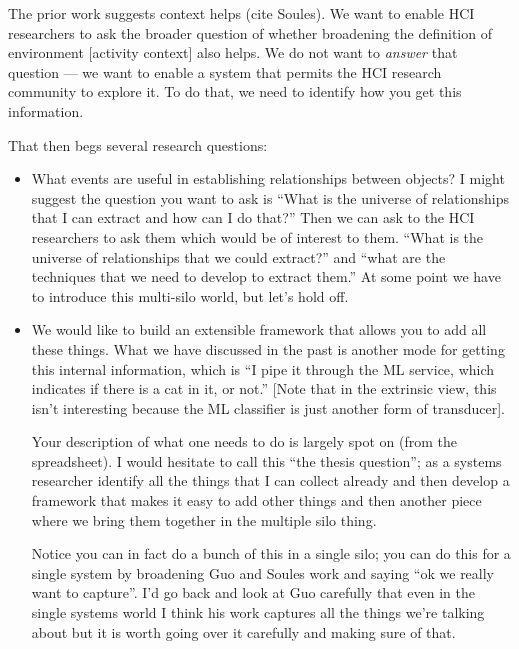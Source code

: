 \item The prior work suggests context helps (cite Soules).  We want to
enable HCI researchers to ask the broader question of whether broadening the
definition of environment [activity context] also helps.  We do not want to
\emph{answer} that question --- we want to enable a system that permits the
HCI research community to explore it.  To do that, we need to identify how
you get this information.

That then begs several research questions:

\begin{itemize}

    \item What events are useful in establishing relationships between objects?
          I might suggest the question you want to ask is ``What is the universe of
          relationships that I can extract and how can I do that?''  Then we can ask
          to the HCI researchers to ask them which would be of interest to them.
          ``What is the universe of relationships that we could extract?'' and ``what
          are the techniques that we need to develop to extract them.''  At some point
          we have to introduce this multi-silo world, but let's hold off.

    \item We would like to build an extensible framework that allows you to add
          all these things.  What we have discussed in the past is another mode for
          getting this internal information, which is ``I pipe it through the ML
          service, which indicates if there is a cat in it, or not.'' [Note that in
          the extrinsic view, this isn't interesting because the ML classifier is just
          another form of transducer].

          Your description of what one needs to do is largely spot on (from the
          spreadsheet).  I would hesitate to call this ``the thesis question''; as a
          systems researcher identify all the things that I can collect already and
          then develop a framework that makes it easy to add other things and then
          another piece where we bring them together in the multiple silo thing.

          Notice you can in fact do a bunch of this in a single silo; you can do this
          for a single system by broadening Guo and Soules work and saying ``ok we
          really want to capture''.  I'd go back and look at Guo carefully that even
          in the single systems world I think his work captures all the things we're
          talking about but it is worth going over it carefully and making sure of
          that.


\end{itemize}
